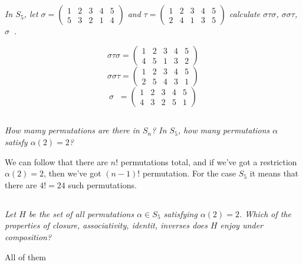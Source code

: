\documentclass[11pt,oneside,titlepage]{book}
\DeclareMathOperator \inv {^{-1}}
\begin{document}
\subsection{}

\textit{In $S_5$, let $\sigma =
  \begin{pmatrix}
    1 & 2 & 3 & 4 & 5 \\
    5 & 3 & 2 & 1 & 4
  \end{pmatrix}
  $
  and
  $\tau =
  \begin{pmatrix}
    1 & 2 & 3 & 4 & 5 \\
    2 & 4 & 1 & 3 & 5
  \end{pmatrix}
  $
  calculate $\sigma \tau \sigma$, $\sigma \sigma \tau$, $\sigma \inv$.
}

$$\sigma \tau \sigma =
\begin{pmatrix}
  1 & 2 & 3 & 4 & 5 \\
  4 & 5 & 1 & 3 & 2
\end{pmatrix}
$$
$$\sigma \sigma \tau =
\begin{pmatrix}
  1 & 2 & 3 & 4 & 5 \\
  2 & 5 & 4 & 3 & 1 
\end{pmatrix}
$$
$$\sigma \inv =
\begin{pmatrix}
  1 & 2 & 3 & 4 & 5 \\
  4 & 3 & 2 & 5 & 1
\end{pmatrix}
$$

\subsection{}

\textit{How mamy permutations are there in $S_n$? In $S_5$, how many permutations $\alpha$
  satisfy $\alpha(2) = 2$?}

We can follow that there are $n!$ permutations total, and if we've got a restriction
$\alpha(2) = 2$, then we've got $(n - 1)!$ permutation. For the case $S_5$ it means
that there are $4! = 24$ such permutations.

\subsection{}

\textit{Let $H$ be the set of all permutations $\alpha \in S_5$ satisfying $\alpha(2) = 2$.
  Which of the properties of closure, associativity, identit, inverses does $H$ enjoy
  under composition?}

All of them
\end{document}
